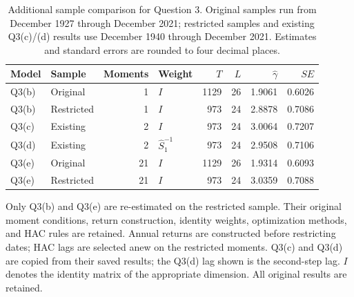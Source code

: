 \begin{table}[!htbp]
  \centering
  \small
  \caption{Additional sample comparison for Question 3.
  Original samples run from December 1927 through December 2021;
  restricted samples and existing Q3(c)/(d) results use December 1940
  through December 2021. Estimates and standard errors are rounded to four decimal places.}
  \label{tab:q3-sample-comparison}
  \setlength{\tabcolsep}{5pt}
  \begin{tabular}{llrlrrrr}
    \toprule
    Model & Sample & Moments & Weight & $T$ & $L$ & $\hat\gamma$ & $SE$ \\
    \midrule
    Q3(b) & Original & 1 & $I$ & 1129 & 26 & 1.9061 & 0.6026 \\
    Q3(b) & Restricted & 1 & $I$ & 973 & 24 & 2.8878 & 0.7086 \\
    Q3(c) & Existing & 2 & $I$ & 973 & 24 & 3.0064 & 0.7207 \\
    Q3(d) & Existing & 2 & $\hat S_1^{-1}$ & 973 & 24 & 2.9508 & 0.7106 \\
    Q3(e) & Original & 21 & $I$ & 1129 & 26 & 1.9314 & 0.6093 \\
    Q3(e) & Restricted & 21 & $I$ & 973 & 24 & 3.0359 & 0.7088 \\
    \bottomrule
  \end{tabular}
  \par\medskip
  \begin{minipage}{0.97\textwidth}\footnotesize
  Only Q3(b) and Q3(e) are re-estimated on the restricted sample.
  Their original moment conditions, return construction, identity weights,
  optimization methods, and HAC rules are retained. Annual returns are
  constructed before restricting dates; HAC lags are selected anew on the
  restricted moments. Q3(c) and Q3(d) are copied from their saved results;
  the Q3(d) lag shown is the second-step lag. $I$ denotes the identity matrix
  of the appropriate dimension. All original results are retained.
  \end{minipage}
\end{table}
